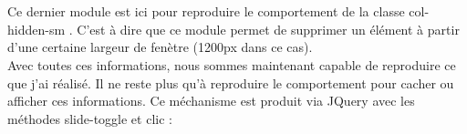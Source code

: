 \documentclass{article}
\begin{document}
\vspace{0.5cm}\\
\vspace{0.5cm}\\
Ce dernier module est ici pour reproduire le comportement de la classe \og col-hidden-sm \fg{}. C'est \`a dire que ce module permet de supprimer un \'el\'ement \`a partir d'une certaine largeur de fen\`etre (1200px dans ce cas).\\
Avec toutes ces informations, nous sommes maintenant capable de reproduire ce que j'ai r\'ealis\'e. Il ne reste plus qu'\`a reproduire le comportement pour cacher ou afficher ces informations. Ce m\'echanisme est produit via JQuery avec les m\'ethodes \og slide-toggle \fg{} et \og clic \fg{} :  
\vspace{0.5cm}\\
\vspace{0.5cm}\\
\end{document}
